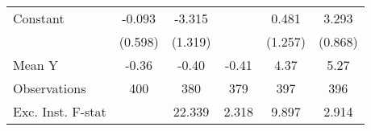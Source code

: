 {\begin{tabular}{l*{5}{c}}
\addlinespace
Constant            &      -0.093         &      -3.315\sym{**} &                     &       0.481         &       3.293\sym{***}\\
                    &     (0.598)         &     (1.319)         &                     &     (1.257)         &     (0.868)         \\
\midrule
Mean Y              &       -0.36         &       -0.40         &       -0.41         &        4.37         &        5.27         \\
Observations        &         400         &         380         &         379         &         397         &         396         \\
Exc. Inst. F-stat   &                     &      22.339         &       2.318         &       9.897         &       2.914         \\
\bottomrule
\end{tabular}
}
